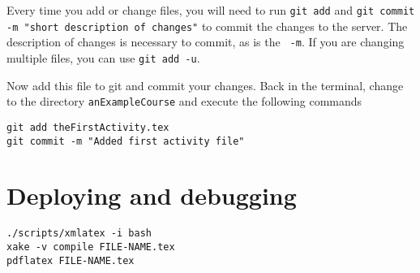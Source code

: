 \documentclass{ximera}
\begin{document}
Every time you add or change files, you will need to run \verb!git add!
and
\verb!git commit -m "short description of changes"! to commit the
changes to
the server. The description of changes is necessary to commit, as is
the
\verb! -m!. If you are changing multiple files, you can use
\verb!git add -u!.



Now add this file to git and commit your changes. Back in the terminal,
change to the directory \verb!anExampleCourse!
and execute the following commands
\begin{verbatim}
git add theFirstActivity.tex
git commit -m "Added first activity file"
\end{verbatim}

\section{Deploying and debugging}


\begin{example}
\begin{verbatim}
./scripts/xmlatex -i bash
xake -v compile FILE-NAME.tex
pdflatex FILE-NAME.tex
\end{verbatim}
\end{example}
\end{document}
